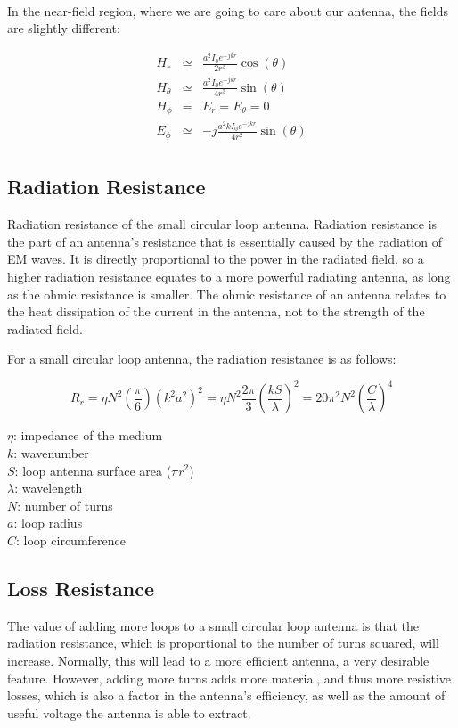 \documentclass[12pt,onecolumn,titlepage]{article}
\begin{document}
 \\
In the near-field region, where we are going to care about our antenna, the fields are slightly different:

\begin{eqnarray}
H_r &\simeq& \frac{a^2 I_0 e^{-jkr}}{2r^3} \cos(\theta) \\
H_\theta &\simeq& \frac{a^2 I_0 e^{-jkr}}{4r^3} \sin(\theta) \\
H_\phi &=& E_r = E_\theta = 0 \\
E_\phi &\simeq& -j \frac{a^2 k I_0 e^{-jkr}}{4r^2} \sin(\theta) \\
\end{eqnarray}


\subsection{Radiation Resistance}
\indent \indent Radiation resistance of the small circular loop antenna. Radiation resistance is the part of an antenna's resistance that is essentially caused by the radiation of EM waves. It is directly proportional to the power in the radiated field, so a higher radiation resistance equates to a more powerful radiating antenna, as long as the ohmic resistance is smaller. The ohmic resistance of an antenna relates to the heat dissipation of the current in the antenna, not to the strength of the radiated field.

For a small circular loop antenna, the radiation resistance is as follows:

\[R_r = \eta N^2 \left( \frac{\pi}{6} \right) \left( k^2 a^2 \right)^2 = \eta N^2 \frac{2\pi}{3} \left( \frac{kS}{\lambda} \right)^2 = 20\pi^2 N^2 \left( \frac{C}{\lambda} \right)^4 \]

\noindent $\eta$: impedance of the medium \\
$k$: wavenumber \\
$S$: loop antenna surface area ($\pi r^2$) \\
$\lambda$: wavelength \\
$N$: number of turns \\
$a$: loop radius \\
$C$: loop circumference \\



\subsection{Loss Resistance}
\indent \indent The value of adding more loops to a small circular loop antenna is that the radiation resistance, which is proportional to the number of turns squared, will increase. Normally, this will lead to a more efficient antenna, a very desirable feature. However, adding more turns adds more material, and thus more resistive losses, which is also a factor in the antenna's efficiency, as well as the amount of useful voltage the antenna is able to extract.
\end{document}
